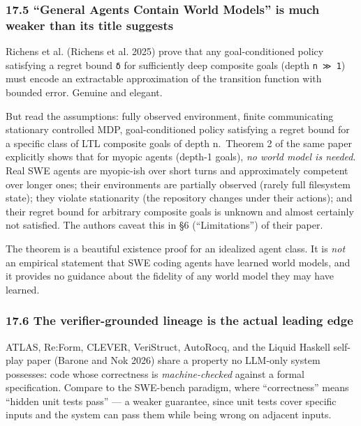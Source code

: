 \documentclass{article}
\begin{document}
\hypertarget{general-agents-contain-world-models-is-much-weaker-than-its-title-suggests}{%
\subsubsection{17.5 ``General Agents Contain World Models'' is much
weaker than its title
suggests}\label{general-agents-contain-world-models-is-much-weaker-than-its-title-suggests}}

Richens et al. (Richens et al. 2025) prove that any goal-conditioned
policy satisfying a regret bound \texttt{δ} for sufficiently deep
composite goals (depth \texttt{n\ ≫\ 1}) must encode an extractable
approximation of the transition function with bounded error. Genuine and
elegant.

But read the assumptions: fully observed environment, finite
communicating stationary controlled MDP, goal-conditioned policy
satisfying a regret bound for a specific class of LTL composite goals of
depth n.~Theorem 2 of the same paper explicitly shows that for myopic
agents (depth-1 goals), \emph{no world model is needed}. Real SWE agents
are myopic-ish over short turns and approximately competent over longer
ones; their environments are partially observed (rarely full filesystem
state); they violate stationarity (the repository changes under their
actions); and their regret bound for arbitrary composite goals is
unknown and almost certainly not satisfied. The authors caveat this in
§6 (``Limitations'') of their paper.

The theorem is a beautiful existence proof for an idealized agent class.
It is \emph{not} an empirical statement that SWE coding agents have
learned world models, and it provides no guidance about the fidelity of
any world model they may have learned.

\hypertarget{the-verifier-grounded-lineage-is-the-actual-leading-edge}{%
\subsubsection{17.6 The verifier-grounded lineage is the actual leading
edge}\label{the-verifier-grounded-lineage-is-the-actual-leading-edge}}

ATLAS, Re:Form, CLEVER, VeriStruct, AutoRocq, and the Liquid Haskell
self-play paper (Barone and Nok 2026) share a property no LLM-only
system possesses: code whose correctness is \emph{machine-checked}
against a formal specification. Compare to the SWE-bench paradigm, where
``correctness'' means ``hidden unit tests pass'' --- a weaker guarantee,
since unit tests cover specific inputs and the system can pass them
while being wrong on adjacent inputs.
\end{document}
